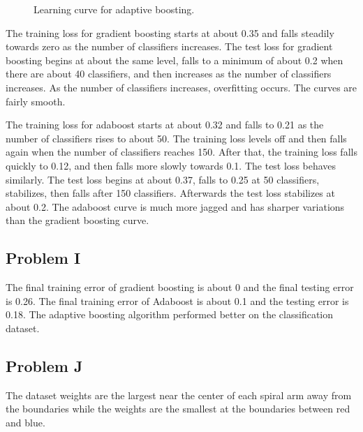 \documentclass[12pt]{article} %
\begin{document}
\begin{figure}[H]
	\vspace{-10mm}
	\caption{Learning curve for adaptive boosting.}
\end{figure}

The training loss for gradient boosting starts at about 0.35 and falls steadily towards zero as the number of classifiers increases. The test loss for gradient boosting begins at about the same level, falls to a minimum of about 0.2 when there are about 40 classifiers, and then increases as the number of classifiers increases. As the number of classifiers increases, overfitting occurs. The curves are fairly smooth.

The training loss for adaboost starts at about 0.32 and falls to 0.21 as the number of classifiers rises to about 50. The training loss levels off and then falls again when the number of classifiers reaches 150. After that, the training loss falls quickly to 0.12, and then falls more slowly towards 0.1. The test loss behaves similarly. The test loss begins at about 0.37, falls to 0.25 at 50 classifiers, stabilizes, then falls after 150 classifiers. Afterwards the test loss stabilizes at about 0.2. The adaboost curve is much more jagged and has sharper variations than the gradient boosting curve.


\subsection{Problem I}
The final training error of gradient boosting is about 0 and the final testing error is 0.26. The final training error of Adaboost is about 0.1 and the testing error is 0.18. The adaptive boosting algorithm performed better on the classification dataset.

\subsection{Problem J}

The dataset weights are the largest near the center of each spiral arm away from the boundaries while the weights are the smallest at the boundaries between red and blue.
\end{document}
